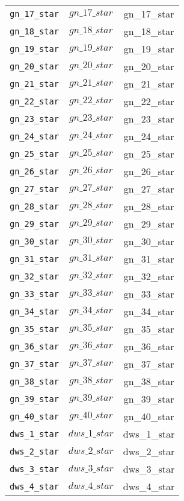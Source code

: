 \begin{center}
\begin{longtable}{ccc}
\texttt{gn\_17\_star} & $gn\_17\_star$ & gn\_17\_star\\
\texttt{gn\_18\_star} & $gn\_18\_star$ & gn\_18\_star\\
\texttt{gn\_19\_star} & $gn\_19\_star$ & gn\_19\_star\\
\texttt{gn\_20\_star} & $gn\_20\_star$ & gn\_20\_star\\
\texttt{gn\_21\_star} & $gn\_21\_star$ & gn\_21\_star\\
\texttt{gn\_22\_star} & $gn\_22\_star$ & gn\_22\_star\\
\texttt{gn\_23\_star} & $gn\_23\_star$ & gn\_23\_star\\
\texttt{gn\_24\_star} & $gn\_24\_star$ & gn\_24\_star\\
\texttt{gn\_25\_star} & $gn\_25\_star$ & gn\_25\_star\\
\texttt{gn\_26\_star} & $gn\_26\_star$ & gn\_26\_star\\
\texttt{gn\_27\_star} & $gn\_27\_star$ & gn\_27\_star\\
\texttt{gn\_28\_star} & $gn\_28\_star$ & gn\_28\_star\\
\texttt{gn\_29\_star} & $gn\_29\_star$ & gn\_29\_star\\
\texttt{gn\_30\_star} & $gn\_30\_star$ & gn\_30\_star\\
\texttt{gn\_31\_star} & $gn\_31\_star$ & gn\_31\_star\\
\texttt{gn\_32\_star} & $gn\_32\_star$ & gn\_32\_star\\
\texttt{gn\_33\_star} & $gn\_33\_star$ & gn\_33\_star\\
\texttt{gn\_34\_star} & $gn\_34\_star$ & gn\_34\_star\\
\texttt{gn\_35\_star} & $gn\_35\_star$ & gn\_35\_star\\
\texttt{gn\_36\_star} & $gn\_36\_star$ & gn\_36\_star\\
\texttt{gn\_37\_star} & $gn\_37\_star$ & gn\_37\_star\\
\texttt{gn\_38\_star} & $gn\_38\_star$ & gn\_38\_star\\
\texttt{gn\_39\_star} & $gn\_39\_star$ & gn\_39\_star\\
\texttt{gn\_40\_star} & $gn\_40\_star$ & gn\_40\_star\\
\texttt{dws\_1\_star} & $dws\_1\_star$ & dws\_1\_star\\
\texttt{dws\_2\_star} & $dws\_2\_star$ & dws\_2\_star\\
\texttt{dws\_3\_star} & $dws\_3\_star$ & dws\_3\_star\\
\texttt{dws\_4\_star} & $dws\_4\_star$ & dws\_4\_star\\

\end{longtable}
\end{center}
